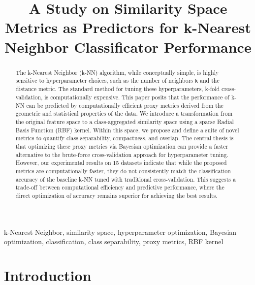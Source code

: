 \documentclass[conference]{IEEEtran}
\begin{document}
\title{A Study on Similarity Space Metrics as Predictors for k-Nearest Neighbor Classificator Performance}

\author{
}

\maketitle

\begin{abstract}
The k-Nearest Neighbor (k-NN) algorithm, while conceptually simple, is highly sensitive to hyperparameter choices, such as the number of neighbors \texttt{k} and the distance metric. The standard method for tuning these hyperparameters, k-fold cross-validation, is computationally expensive. This paper posits that the performance of k-NN can be predicted by computationally efficient proxy metrics derived from the geometric and statistical properties of the data. We introduce a transformation from the original feature space to a class-aggregated similarity space using a sparse Radial Basis Function (RBF) kernel. Within this space, we propose and define a suite of novel metrics to quantify class separability, compactness, and overlap. The central thesis is that optimizing these proxy metrics via Bayesian optimization can provide a faster alternative to the brute-force cross-validation approach for hyperparameter tuning. However, our experimental results on 15 datasets indicate that while the proposed metrics are computationally faster, they do not consistently match the classification accuracy of the baseline k-NN tuned with traditional cross-validation. This suggests a trade-off between computational efficiency and predictive performance, where the direct optimization of accuracy remains superior for achieving the best results.
\end{abstract}

\begin{IEEEkeywords}
k-Nearest Neighbor, similarity space, hyperparameter optimization, Bayesian optimization, classification, class separability, proxy metrics, RBF kernel
\end{IEEEkeywords}

\section{Introduction}
\end{document}
